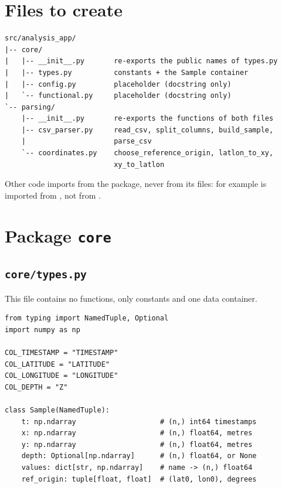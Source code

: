 \documentclass{article}
\begin{document}
\section{Files to create}
\label{sec:files}

\begin{lstlisting}
src/analysis_app/
|-- core/
|   |-- __init__.py       re-exports the public names of types.py
|   |-- types.py          constants + the Sample container
|   |-- config.py         placeholder (docstring only)
|   `-- functional.py     placeholder (docstring only)
`-- parsing/
    |-- __init__.py       re-exports the functions of both files
    |-- csv_parser.py     read_csv, split_columns, build_sample,
    |                     parse_csv
    `-- coordinates.py    choose_reference_origin, latlon_to_xy,
                          xy_to_latlon
\end{lstlisting}

Other code imports from the package, never from its files: for
example  is imported from , not
from .

\section{Package \texttt{core}}
\label{sec:core}

\subsection{\texttt{core/types.py}}

This file contains no functions, only constants and one data container.

\begin{lstlisting}
from typing import NamedTuple, Optional
import numpy as np

COL_TIMESTAMP = "TIMESTAMP"
COL_LATITUDE = "LATITUDE"
COL_LONGITUDE = "LONGITUDE"
COL_DEPTH = "Z"

class Sample(NamedTuple):
    t: np.ndarray                    # (n,) int64 timestamps
    x: np.ndarray                    # (n,) float64, metres
    y: np.ndarray                    # (n,) float64, metres
    depth: Optional[np.ndarray]      # (n,) float64, or None
    values: dict[str, np.ndarray]    # name -> (n,) float64
    ref_origin: tuple[float, float]  # (lat0, lon0), degrees
\end{lstlisting}
\end{document}
